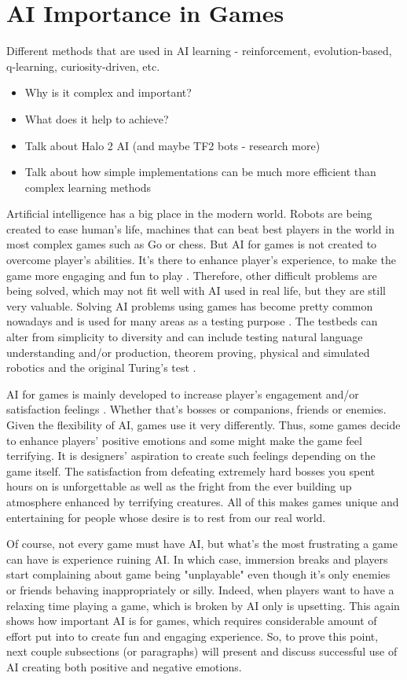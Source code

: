 \documentclass[journal]{IEEEtran}
\begin{document}
\section{AI Importance in Games}
Different methods that are used in AI learning - reinforcement, evolution-based, q-learning, curiosity-driven, etc. 
\begin{itemize}
	\item Why is it complex and important?
	\item What does it help to achieve? 
	\item Talk about Halo 2 AI (and maybe TF2 bots - research more)
	\item Talk about how simple implementations can be much more efficient than complex learning methods
\end{itemize}

Artificial intelligence has a big place in the modern world. Robots are being created to ease human's life, machines that can beat best players in the world in most complex games such as Go \cite{alphago} or chess. But AI for games is not created to overcome player's abilities. It's there to enhance player's experience, to make the game more engaging and fun to play \cite{aiinvideogames}. Therefore, other difficult problems are being solved, which may not fit well with AI used in real life, but they are still very valuable. Solving AI problems using games has become pretty common nowadays and is used for many areas as a testing purpose \cite{schaul2011measuring}. The testbeds can alter from simplicity to diversity \cite{schaul2011measuring} and can include testing natural language understanding and/or production, theorem proving, physical and simulated robotics and the original Turing's test \cite{schaul2011measuring}.

AI for games is mainly developed to increase player's engagement and/or satisfaction feelings \cite{halo2}. Whether that's bosses or companions, friends or enemies. Given the flexibility of AI, games use it very differently. Thus, some games decide to enhance players' positive emotions and some might make the game feel terrifying. It is designers' aspiration to create such feelings depending on the game itself. The satisfaction from defeating extremely hard bosses you spent hours on is unforgettable as well as the fright from the ever building up atmosphere enhanced by terrifying creatures. All of this makes games unique and entertaining for people whose desire is to rest from our real world.

Of course, not every game must have AI, but what's the most frustrating a game can have is experience ruining AI. In which case, immersion breaks and players start complaining about game being "unplayable" even though it's only enemies or friends behaving inappropriately or silly. Indeed, when players want to have a relaxing time playing a game, which is broken by AI only is upsetting. This again shows how important AI is for games, which requires considerable amount of effort put into to create fun and engaging experience. So, to prove this point, next couple subsections (or paragraphs) will present and discuss successful use of AI creating both positive and negative emotions.
\end{document}

